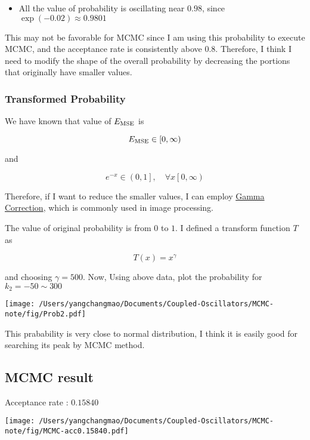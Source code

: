 \documentclass[
]{article}
\begin{document}
\begin{itemize}
\item
  All the value of probability is oscillating near \(0.98\), since
  \(\exp(-0.02)\approx 0.9801\)
\end{itemize}

This may not be favorable for MCMC since I am using this probability to execute MCMC, and the acceptance rate is consistently above 0.8. Therefore, I think I need to modify the shape of the overall probability by decreasing the portions that originally have smaller values.

\hypertarget{transformed-probability}{%
\subsubsection{Transformed Probability}\label{transformed-probability}}

We have known that value of \(E_{\rm MSE}\) is

\[E_{\rm MSE}\in \left[0, \infty\right)\]

and

\[e^{-x} \in \left(0, 1\right], \quad \forall x \left[0, \infty\right)\]

Therefore, if I want to reduce the smaller values, I can employ
\href{https://en.wikipedia.org/wiki/Gamma_correction}{Gamma Correction},
which is commonly used in image processing.

The value of original probability is from \(0\) to \(1\). I defined a
transform function \(T\) as

\[T\left(x\right)=x^{\gamma}\]

and choosing \(\gamma=500\). Now, Using above data, plot the probability
for \(k_2=-50\sim 300\)

\texttt{[image: /Users/yangchangmao/Documents/Coupled-Oscillators/MCMC-note/fig/Prob2.pdf]}

This prabability is very close to normal distribution, I think it is
easily good for searching its peak by MCMC method.


\newpage
\hypertarget{mcmc-result}{%
\subsection{MCMC result}\label{mcmc-result}}

Acceptance rate : \(0.15840\)

\texttt{[image: /Users/yangchangmao/Documents/Coupled-Oscillators/MCMC-note/fig/MCMC-acc0.15840.pdf]}
\end{document}
